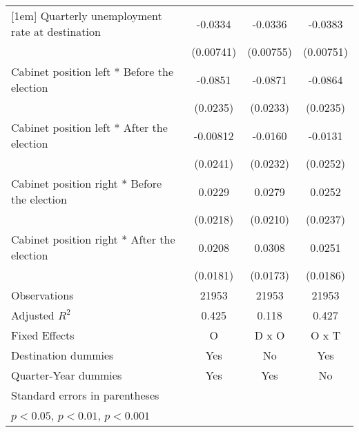 \begin{table}[htbp]
\begin{tabular}{l*{3}{c}}
[1em]
Quarterly unemployment rate at destination&     -0.0334\sym{***}&     -0.0336\sym{***}&     -0.0383\sym{***}\\
                    &   (0.00741)         &   (0.00755)         &   (0.00751)         \\
[1em]
Cabinet position left * Before the election&     -0.0851\sym{***}&     -0.0871\sym{***}&     -0.0864\sym{***}\\
                    &    (0.0235)         &    (0.0233)         &    (0.0235)         \\
[1em]
Cabinet position left * After the election&    -0.00812         &     -0.0160         &     -0.0131         \\
                    &    (0.0241)         &    (0.0232)         &    (0.0252)         \\
[1em]
Cabinet position right * Before the election&      0.0229         &      0.0279         &      0.0252         \\
                    &    (0.0218)         &    (0.0210)         &    (0.0237)         \\
[1em]
Cabinet position right * After the election&      0.0208         &      0.0308         &      0.0251         \\
                    &    (0.0181)         &    (0.0173)         &    (0.0186)         \\
\hline
Observations        &       21953         &       21953         &       21953         \\
Adjusted \(R^{2}\)  &       0.425         &       0.118         &       0.427         \\
Fixed Effects       &           O         &       D x O         &       O x T         \\
Destination dummies &         Yes         &          No         &         Yes         \\
Quarter-Year dummies&         Yes         &         Yes         &          No         \\
\hline\hline
\multicolumn{4}{l}{\footnotesize Standard errors in parentheses}\\
\multicolumn{4}{l}{\footnotesize \sym{*} \(p<0.05\), \sym{**} \(p<0.01\), \sym{***} \(p<0.001\)}\\
\end{tabular}
\end{table}
